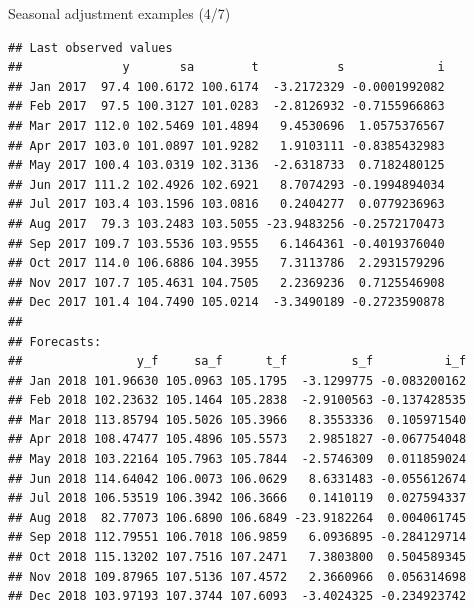 \documentclass[10pt,xcolor=table,color={dvipsnames,usenames},ignorenonframetext,usepdftitle=false,french]{beamer}
\newenvironment{Shaded}{\begin{snugshade}}{\end{snugshade}}
\newcommand{\NormalTok}[1]{#1}
\newcommand{\OperatorTok}[1]{\textcolor[rgb]{0.81,0.36,0.00}{\textbf{#1}}}
\begin{document}
\begin{frame}[fragile]{Seasonal adjustment examples (4/7)}
\protect\hypertarget{seasonal-adjustment-examples-47}{}

\footnotesize

\begin{Shaded}
\end{Shaded}

\begin{verbatim}
## Last observed values
##              y       sa        t           s             i
## Jan 2017  97.4 100.6172 100.6174  -3.2172329 -0.0001992082
## Feb 2017  97.5 100.3127 101.0283  -2.8126932 -0.7155966863
## Mar 2017 112.0 102.5469 101.4894   9.4530696  1.0575376567
## Apr 2017 103.0 101.0897 101.9282   1.9103111 -0.8385432983
## May 2017 100.4 103.0319 102.3136  -2.6318733  0.7182480125
## Jun 2017 111.2 102.4926 102.6921   8.7074293 -0.1994894034
## Jul 2017 103.4 103.1596 103.0816   0.2404277  0.0779236963
## Aug 2017  79.3 103.2483 103.5055 -23.9483256 -0.2572170473
## Sep 2017 109.7 103.5536 103.9555   6.1464361 -0.4019376040
## Oct 2017 114.0 106.6886 104.3955   7.3113786  2.2931579296
## Nov 2017 107.7 105.4631 104.7505   2.2369236  0.7125546908
## Dec 2017 101.4 104.7490 105.0214  -3.3490189 -0.2723590878
## 
## Forecasts:
##                y_f     sa_f      t_f         s_f          i_f
## Jan 2018 101.96630 105.0963 105.1795  -3.1299775 -0.083200162
## Feb 2018 102.23632 105.1464 105.2838  -2.9100563 -0.137428535
## Mar 2018 113.85794 105.5026 105.3966   8.3553336  0.105971540
## Apr 2018 108.47477 105.4896 105.5573   2.9851827 -0.067754048
## May 2018 103.22164 105.7963 105.7844  -2.5746309  0.011859024
## Jun 2018 114.64042 106.0073 106.0629   8.6331483 -0.055612674
## Jul 2018 106.53519 106.3942 106.3666   0.1410119  0.027594337
## Aug 2018  82.77073 106.6890 106.6849 -23.9182264  0.004061745
## Sep 2018 112.79551 106.7018 106.9859   6.0936895 -0.284129714
## Oct 2018 115.13202 107.7516 107.2471   7.3803800  0.504589345
## Nov 2018 109.87965 107.5136 107.4572   2.3660966  0.056314698
## Dec 2018 103.97193 107.3744 107.6093  -3.4024325 -0.234923742
\end{verbatim}

\end{frame}
\end{document}
